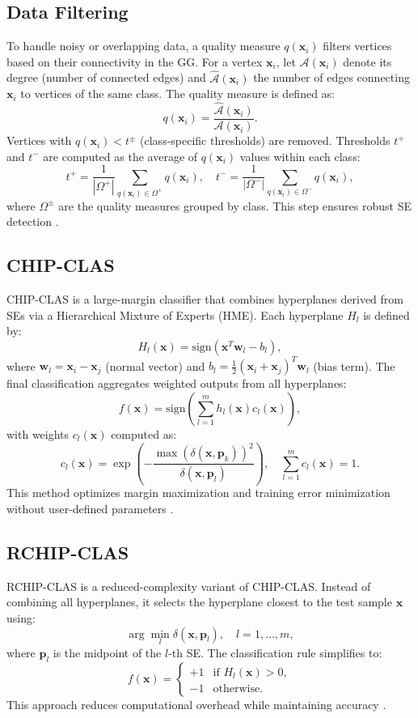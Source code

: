 \documentclass[conference]{IEEEtran}
\begin{document}
\subsection{Data Filtering}
To handle noisy or overlapping data, a quality measure \(q(\mathbf{x}_i)\) filters vertices based on their connectivity in the GG. For a vertex \(\mathbf{x}_i\), let \(\mathcal{A}(\mathbf{x}_i)\) denote its degree (number of connected edges) and \(\hat{\mathcal{A}}(\mathbf{x}_i)\) the number of edges connecting \(\mathbf{x}_i\) to vertices of the same class. The quality measure is defined as:
\[
q(\mathbf{x}_i) = \frac{\hat{\mathcal{A}}(\mathbf{x}_i)}{\mathcal{A}(\mathbf{x}_i)}.
\]
Vertices with \(q(\mathbf{x}_i) < t^\pm\) (class-specific thresholds) are removed. Thresholds \(t^+\) and \(t^-\) are computed as the average of \(q(\mathbf{x}_i)\) values within each class:
\[
t^+ = \frac{1}{|\Omega^+|}\sum_{q(\mathbf{x}_i) \in \Omega^+} q(\mathbf{x}_i), \quad t^- = \frac{1}{|\Omega^-|}\sum_{q(\mathbf{x}_i) \in \Omega^-} q(\mathbf{x}_i),
\]
where \(\Omega^\pm\) are the quality measures grouped by class. This step ensures robust SE detection \cite{arias2021, torres2016}.

\subsection{CHIP-CLAS}
CHIP-CLAS is a large-margin classifier that combines hyperplanes derived from SEs via a Hierarchical Mixture of Experts (HME). Each hyperplane \(H_l\) is defined by:
\[
H_l(\mathbf{x}) = \text{sign}(\mathbf{x}^T \mathbf{w}_l - b_l),
\]
where \(\mathbf{w}_l = \mathbf{x}_i - \mathbf{x}_j\) (normal vector) and \(b_l = \frac{1}{2}(\mathbf{x}_i + \mathbf{x}_j)^T \mathbf{w}_l\) (bias term). The final classification aggregates weighted outputs from all hyperplanes:
\[
f(\mathbf{x}) = \text{sign}\left(\sum_{l=1}^m h_l(\mathbf{x}) c_l(\mathbf{x})\right),
\]
with weights \(c_l(\mathbf{x})\) computed as:
\[
c_l(\mathbf{x}) = \exp\left(-\frac{\max(\delta(\mathbf{x}, \mathbf{p}_k))^2}{\delta(\mathbf{x}, \mathbf{p}_l)}\right), \quad \sum_{l=1}^m c_l(\mathbf{x}) = 1.
\]
This method optimizes margin maximization and training error minimization without user-defined parameters \cite{torres2015, torres2015b}.

\subsection{RCHIP-CLAS}
RCHIP-CLAS is a reduced-complexity variant of CHIP-CLAS. Instead of combining all hyperplanes, it selects the hyperplane closest to the test sample \(\mathbf{x}\) using:
\[
\arg\min_l \delta(\mathbf{x}, \mathbf{p}_l), \quad l = 1, \ldots, m,
\]
where \(\mathbf{p}_l\) is the midpoint of the \(l\)-th SE. The classification rule simplifies to:
\[
f(\mathbf{x}) = \begin{cases} 
+1 & \text{if } H_l(\mathbf{x}) > 0, \\
-1 & \text{otherwise}.
\end{cases}
\]
This approach reduces computational overhead while maintaining accuracy \cite{arias2021}.
\end{document}
